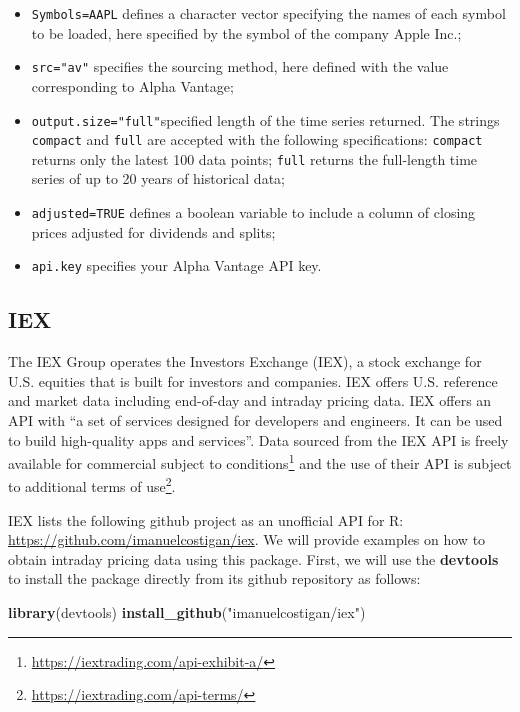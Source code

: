 \documentclass[]{book}
\newenvironment{Shaded}{\begin{snugshade}}{\end{snugshade}}
\newcommand{\KeywordTok}[1]{\textcolor[rgb]{0.13,0.29,0.53}{\textbf{#1}}}
\newcommand{\StringTok}[1]{\textcolor[rgb]{0.31,0.60,0.02}{#1}}
\newcommand{\NormalTok}[1]{#1}
\DeclareRobustCommand{\href}[2]{#2\footnote{\url{#1}}}
\providecommand{\tightlist}{%
  \setlength{\itemsep}{0pt}\setlength{\parskip}{0pt}}
\theoremstyle{definition}
\theoremstyle{definition}
\theoremstyle{definition}
\theoremstyle{remark}
\begin{document}
\begin{itemize}
\tightlist
\item
  \texttt{Symbols=\textquotesingle{}AAPL\textquotesingle{}} defines a
  character vector specifying the names of each symbol to be loaded,
  here specified by the symbol of the company Apple Inc.;
\item
  \texttt{src="av"} specifies the sourcing method, here defined with the
  value corresponding to Alpha Vantage;
\item
  \texttt{output.size="full"}specified length of the time series
  returned. The strings \texttt{compact} and \texttt{full} are accepted
  with the following specifications: \texttt{compact} returns only the
  latest 100 data points; \texttt{full} returns the full-length time
  series of up to 20 years of historical data;
\item
  \texttt{adjusted=TRUE} defines a boolean variable to include a column
  of closing prices adjusted for dividends and splits;
\item
  \texttt{api.key} specifies your Alpha Vantage API key.
\end{itemize}

\subsection{IEX}\label{iex}

The IEX Group operates the Investors Exchange (IEX), a stock exchange
for U.S. equities that is built for investors and companies. IEX offers
U.S. reference and market data including end-of-day and intraday pricing
data. IEX offers an API with ``a set of services designed for developers
and engineers. It can be used to build high-quality apps and services''.
Data sourced from the IEX API is freely available for commercial subject
to \href{https://iextrading.com/api-exhibit-a/}{conditions} and the use
of their API is subject to additional
\href{https://iextrading.com/api-terms/}{terms of use}.

IEX lists the following github project as an unofficial API for R:
\url{https://github.com/imanuelcostigan/iex}. We will provide examples
on how to obtain intraday pricing data using this package. First, we
will use the \textbf{devtools} to install the package directly from its
github repository as follows:

\begin{Shaded}
\begin{Highlighting}[]
\KeywordTok{library}\NormalTok{(devtools)}
\KeywordTok{install_github}\NormalTok{(}\StringTok{"imanuelcostigan/iex"}\NormalTok{)}
\end{Highlighting}
\end{Shaded}
\end{document}
